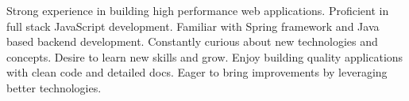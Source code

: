 

\begin{cvparagraph}

Strong experience in building high performance web applications. Proficient in full stack JavaScript development. Familiar with Spring framework and Java based backend development. Constantly curious about new technologies and concepts. Desire to learn new skills and grow. Enjoy building quality applications with clean code and detailed docs. Eager to bring improvements by leveraging better technologies.
\end{cvparagraph}



